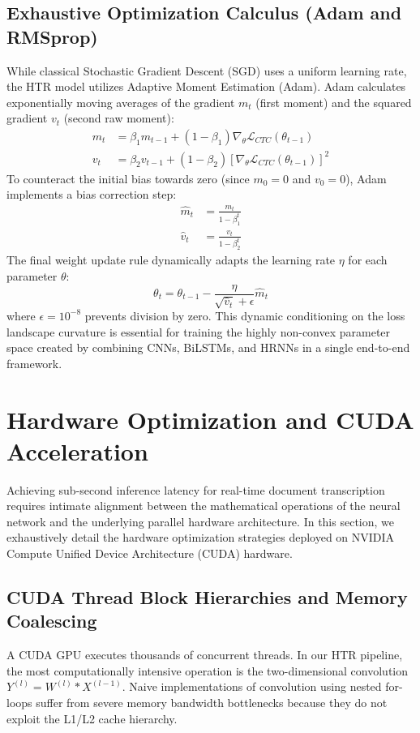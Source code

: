 \subsection{Exhaustive Optimization Calculus (Adam and RMSprop)}
While classical Stochastic Gradient Descent (SGD) uses a uniform learning rate, the HTR model utilizes Adaptive Moment Estimation (Adam). Adam calculates exponentially moving averages of the gradient $m_t$ (first moment) and the squared gradient $v_t$ (second raw moment):
\begin{align}
    m_t &= \beta_1 m_{t-1} + (1 - \beta_1) \nabla_\theta \mathcal{L}_{CTC}(\theta_{t-1}) \\
    v_t &= \beta_2 v_{t-1} + (1 - \beta_2) [\nabla_\theta \mathcal{L}_{CTC}(\theta_{t-1})]^2
\end{align}
To counteract the initial bias towards zero (since $m_0 = 0$ and $v_0 = 0$), Adam implements a bias correction step:
\begin{align}
    \hat{m}_t &= \frac{m_t}{1 - \beta_1^t} \\
    \hat{v}_t &= \frac{v_t}{1 - \beta_2^t}
\end{align}
The final weight update rule dynamically adapts the learning rate $\eta$ for each parameter $\theta$:
\begin{equation}
    \theta_t = \theta_{t-1} - \frac{\eta}{\sqrt{\hat{v}_t} + \epsilon} \hat{m}_t
\end{equation}
where $\epsilon = 10^{-8}$ prevents division by zero. This dynamic conditioning on the loss landscape curvature is essential for training the highly non-convex parameter space created by combining CNNs, BiLSTMs, and HRNNs in a single end-to-end framework.


\section{Hardware Optimization and CUDA Acceleration}
Achieving sub-second inference latency for real-time document transcription requires intimate alignment between the mathematical operations of the neural network and the underlying parallel hardware architecture. In this section, we exhaustively detail the hardware optimization strategies deployed on NVIDIA Compute Unified Device Architecture (CUDA) hardware.

\subsection{CUDA Thread Block Hierarchies and Memory Coalescing}
A CUDA GPU executes thousands of concurrent threads. In our HTR pipeline, the most computationally intensive operation is the two-dimensional convolution $Y^{(l)} = W^{(l)} * X^{(l-1)}$. Naive implementations of convolution using nested for-loops suffer from severe memory bandwidth bottlenecks because they do not exploit the L1/L2 cache hierarchy.


